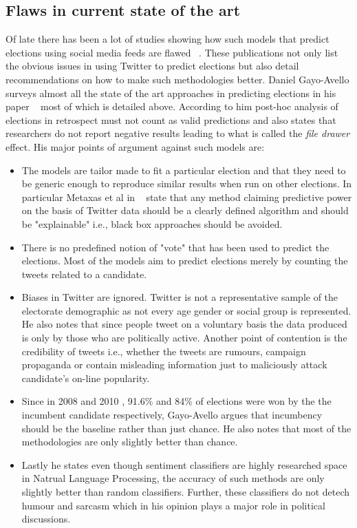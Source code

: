 \subsection{Flaws in current state of the art}
Of late there has been a lot of studies showing how such models that predict elections using social media feeds are flawed ~\cite{metaxas2011not,gayo2012wanted,gayo2011don,gayo2011limits}.
These publications not only list the obvious issues in using Twitter to predict elections but also detail recommendations on how to make such methodologies better.
Daniel Gayo-Avello surveys almost all the state of the art approaches in predicting elections in his paper ~\cite{gayo2012wanted} most of which is detailed above.
According to him post-hoc analysis of elections in retrospect must not count as valid predictions and also states that researchers do not report negative results leading to what is called the \emph{file drawer} effect. 
His major points of argument against such models are:
\begin{itemize}
\item
The models are tailor made to fit a particular election and that they need to be generic enough to reproduce similar results when run on other elections.
In particular Metaxas et al in ~\cite{metaxas2011not} state that any method claiming predictive power on the basis of Twitter data should be a clearly defined algorithm and should be "explainable" i.e., black box approaches should be avoided.
\item
There is no predefined notion of "vote" that has been used to predict the elections.
Most of the models aim to predict elections merely by counting the tweets related to a candidate.
\item
Biases in Twitter are ignored. Twitter is not a representative sample of the electorate demographic as not every age gender or social group is represented.
He also notes that since people tweet on a voluntary basis the data produced is only by those who are politically active. 
Another point of contention is the credibility of tweets i.e., whether the tweets are rumours, campaign propaganda or contain misleading information just to maliciously attack candidate's on-line popularity.
\item
Since in 2008 and 2010 , 91.6\% and 84\% of elections were won by the the incumbent candidate respectively, Gayo-Avello argues that incumbency should be the baseline rather than just chance.
He also notes that most of the methodologies are only slightly better than chance.
\item
Lastly he states even though sentiment classifiers are highly researched space in Natrual Language Processing, the accuracy of such methods are only slightly better than random classifiers. 
Further, these classifiers do not detech humour and sarcasm which in his opinion plays a major role in political discussions.
\end{itemize}


